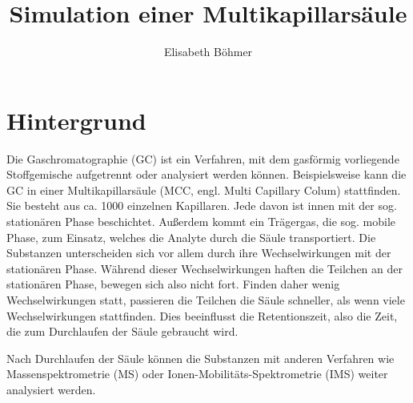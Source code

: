 \documentclass[a4paper,10pt]{article}
\title{Simulation einer Multikapillarsäule}%
\author{Elisabeth Böhmer}
\begin{document}
\maketitle

\section{Hintergrund}


Die Gaschromatographie (GC) ist ein Verfahren, mit dem gasförmig vorliegende Stoffgemische aufgetrennt oder analysiert werden können. 
Beispielsweise kann die GC in einer Multikapillarsäule (MCC, engl. Multi Capillary Colum) stattfinden. Sie besteht aus ca. 1000 %
einzelnen Kapillaren. Jede davon ist innen mit der sog. stationären Phase beschichtet. Außerdem kommt ein Trägergas, die sog. mobile Phase, zum Einsatz, welches die Analyte durch die Säule transportiert. Die Substanzen unterscheiden sich vor allem durch ihre Wechselwirkungen mit der stationären Phase. Während dieser Wechselwirkungen haften die Teilchen an der stationären Phase, bewegen sich also nicht fort. Finden daher wenig Wechselwirkungen statt, passieren die Teilchen die Säule schneller, als wenn viele Wechselwirkungen stattfinden. Dies beeinflusst die Retentionszeit, also die Zeit, die zum Durchlaufen der Säule gebraucht wird.

Nach Durchlaufen der Säule können die Substanzen mit anderen Verfahren wie Massenspektrometrie (MS) oder Ionen-Mobilitäts-Spektrometrie (IMS) weiter analysiert werden.
\end{document}
